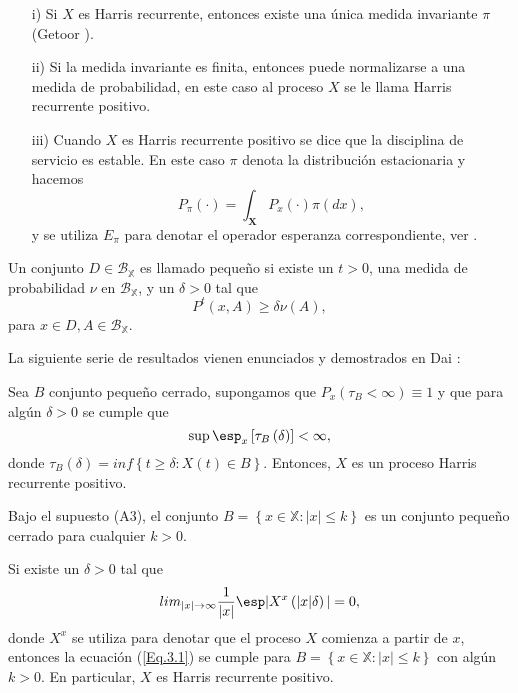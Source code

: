 \begin{Note}
\begin{itemize}
\item[i)] Si $X$ es Harris recurrente, entonces existe una \'unica
medida invariante $\pi$ (Getoor \cite{Getoor}).

\item[ii)] Si la medida invariante es finita, entonces puede
normalizarse a una medida de probabilidad, en este caso al proceso
$X$ se le llama Harris recurrente positivo.


\item[iii)] Cuando $X$ es Harris recurrente positivo se dice que
la disciplina de servicio es estable. En este caso $\pi$ denota la
distribuci\'on estacionaria y hacemos
\[P_{\pi}\left(\cdot\right)=\int_{\mathbf{X}}P_{x}\left(\cdot\right)\pi\left(dx\right),\]
y se utiliza $E_{\pi}$ para denotar el operador esperanza
correspondiente, ver \cite{DaiSean}.
\end{itemize}
\end{Note}

\begin{Def}\label{Def.Cto.Peq.}
Un conjunto $D\in\mathcal{B_{\mathbb{X}}}$ es llamado peque\~no si
existe un $t>0$, una medida de probabilidad $\nu$ en
$\mathcal{B_{\mathbb{X}}}$, y un $\delta>0$ tal que
\[P^{t}\left(x,A\right)\geq\delta\nu\left(A\right),\] para $x\in
D,A\in\mathcal{B_{\mathbb{X}}}$.
\end{Def}

La siguiente serie de resultados vienen enunciados y demostrados
en Dai \cite{Dai}:
\begin{Lema}
Sea $B$ conjunto peque\~no cerrado, supongamos que
$P_{x}\left(\tau_{B}<\infty\right)\equiv1$ y que para alg\'un
$\delta>0$ se cumple que
\begin{equation}\label{Eq.3.1}
\sup\esp_{x}\left[\tau_{B}\left(\delta\right)\right]<\infty,
\end{equation}
donde
$\tau_{B}\left(\delta\right)=inf\left\{t\geq\delta:X\left(t\right)\in
B\right\}$. Entonces, $X$ es un proceso Harris recurrente
positivo.
\end{Lema}

\begin{Lema}\label{Lema.3.}
Bajo el supuesto (A3), el conjunto
$B=\left\{x\in\mathbb{X}:|x|\leq k\right\}$ es un conjunto
peque\~no cerrado para cualquier $k>0$.
\end{Lema}

\begin{Teo}\label{Tma.3.1}
Si existe un $\delta>0$ tal que
\begin{equation}
lim_{|x|\rightarrow\infty}\frac{1}{|x|}\esp|X^{x}\left(|x|\delta\right)|=0,
\end{equation}
donde $X^{x}$ se utiliza para denotar que el proceso $X$ comienza
a partir de $x$, entonces la ecuaci\'on (\ref{Eq.3.1}) se cumple
para $B=\left\{x\in\mathbb{X}:|x|\leq k\right\}$ con alg\'un
$k>0$. En particular, $X$ es Harris recurrente positivo.
\end{Teo}

